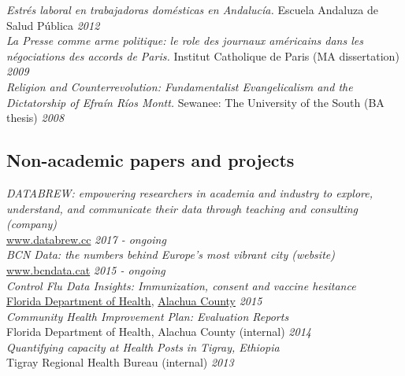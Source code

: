 \documentclass[11pt]{article}
\begin{document}
\noindent \emph{Estrés laboral en trabajadoras domésticas en Andalucía. } Escuela Andaluza de Salud Pública  \hfill \emph{2012}\\

\noindent \emph{La Presse comme arme politique: le role des journaux américains dans les négociations des accords de Paris.} Institut Catholique de Paris (MA dissertation) \hfill \emph{2009}\\

\noindent \emph{Religion and Counterrevolution: Fundamentalist Evangelicalism and the Dictatorship of Efraín Ríos Montt.} Sewanee: The University of the South (BA thesis) \hfill \emph{2008}\\

\subsection*{Non-academic papers and projects}

\noindent \emph{DATABREW: empowering researchers in academia and industry to explore, understand,
and communicate their data through teaching and consulting (company)}\\
\href{www.databrew.cc}{www.databrew.cc} \hfill \emph{2017 - ongoing}\\

\noindent \emph{BCN Data: the numbers behind Europe's most vibrant city (website)}\\
\href{www.bcndata.cat}{www.bcndata.cat} \hfill \emph{2015 - ongoing}\\

\noindent \emph{Control Flu Data Insights: Immunization, consent and vaccine hesitance}\\ \href{http://economicsofmalaria.com/pdfs/estimating.pdf}{Florida Department of Health}, \href{http://economicsofmalaria.com/pdfs/targeting.pdf}{Alachua County} \hfill \emph{2015}\\

\noindent \emph{Community Health Improvement Plan: Evaluation Reports} \\ Florida Department of Health, Alachua County (internal) \hfill \emph{2014}\\

\noindent \emph{Quantifying capacity at Health Posts in Tigray, Ethiopia} \\ Tigray Regional Health Bureau (internal) \hfill \emph{2013}\\
\end{document}
